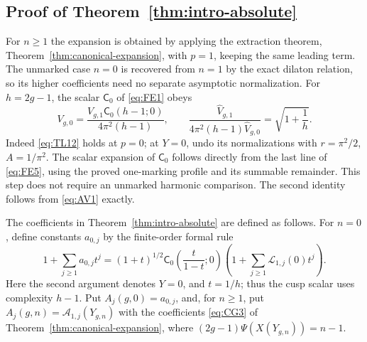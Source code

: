 \subsection{Proof of Theorem~\ref{thm:intro-absolute}}

For $n\ge1$ the expansion is obtained by applying the extraction
theorem, Theorem~\ref{thm:canonical-expansion}, with $p=1$, keeping the
same leading term. The unmarked case $n=0$ is recovered from $n=1$ by the
exact dilaton relation, so its higher coefficients need no separate
asymptotic normalization. For $h=2g-1$, the scalar $\mathsf C_0$ of \eqref{eq:FE1} obeys
\begin{equation}
 V_{g,0}=\frac{V_{g,1}\mathsf C_0(h-1;0)}{4\pi^2(h-1)},\qquad
 \frac{\widehat V_{g,1}}{4\pi^2(h-1)\widehat V_{g,0}}
       =\sqrt{1+\frac1h}.
 \label{eq:AV6}
\end{equation}
Indeed \eqref{eq:TL12} holds at $p=0$; at $Y=0$, undo its
normalizations with $r=\pi^2/2$, $A=1/\pi^2$.
The scalar expansion of $\mathsf C_0$ follows directly from the last
line of \eqref{eq:FE5}, using the proved one-marking profile and its
summable remainder. This step does not require an unmarked harmonic
comparison. The second identity follows from \eqref{eq:AV1} exactly.

The coefficients in Theorem~\ref{thm:intro-absolute} are defined as
follows. For $n=0$, define constants $a_{0,j}$ by the finite-order formal
rule
\begin{equation}
 1+\sum_{j\ge1}a_{0,j}t^j
 =(1+t)^{1/2}\mathsf C_0\!\left(\frac t{1-t};0\right)
       \left(1+\sum_{j\ge1}\mathcal L_{1,j}(0)t^j\right).
 \label{eq:AV7}
\end{equation}
Here the second argument denotes $Y=0$, and $t=1/h$; thus the
cusp scalar uses complexity $h-1$. Put $A_j(g,0)=a_{0,j}$, and, for
$n\ge1$, put $A_j(g,n)=\mathcal A_{1,j}(Y_{g,n})$ with the coefficients
\eqref{eq:CG3} of Theorem~\ref{thm:canonical-expansion}, where
$(2g-1)\Psi(X(Y_{g,n}))=n-1$.

